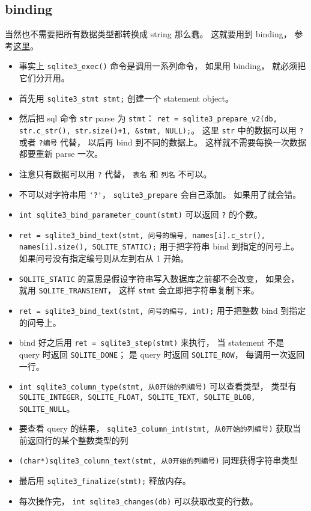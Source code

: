 \subsection{binding}
当然也不需要把所有数据类型都转换成 string 那么蠢。 这就要用到 binding， 参考\href{https://www.sqlite.org/c3ref/bind_blob.html}{这里}。
\begin{itemize}
\item 事实上 \verb`sqlite3_exec()` 命令是调用一系列命令， 如果用 binding， 就必须把它们分开用。
\item 首先用 \verb`sqlite3_stmt stmt;` 创建一个 statement object。
\item 然后把 sql 命令 \verb`str` parse 为 \verb`stmt`： \verb`ret = sqlite3_prepare_v2(db, str.c_str(), str.size()+1, &stmt, NULL);`。 这里 \verb`str` 中的数据可以用 \verb`?` 或者 \verb`?编号` 代替， 以后再 bind 到不同的数据上。 这样就不需要每换一次数据都要重新 parse 一次。
\item 注意只有数据可以用 \verb`?` 代替， \verb`表名` 和 \verb`列名` 不可以。
\item 不可以对字符串用 \verb`'?'`， \verb`sqlite3_prepare` 会自己添加。 如果用了就会错。
\item \verb`int sqlite3_bind_parameter_count(stmt)` 可以返回 \verb`?` 的个数。
\item \verb`ret = sqlite3_bind_text(stmt, 问号的编号, names[i].c_str(), names[i].size(), SQLITE_STATIC);` 用于把字符串 bind 到指定的问号上。 如果问号没有指定编号则从左到右从 1 开始。
\item \verb`SQLITE_STATIC` 的意思是假设字符串写入数据库之前都不会改变， 如果会， 就用 \verb`SQLITE_TRANSIENT`， 这样 \verb`stmt` 会立即把字符串复制下来。
\item \verb`ret = sqlite3_bind_text(stmt, 问号的编号, int);` 用于把整数 bind 到指定的问号上。
\item bind 好之后用 \verb`ret = sqlite3_step(stmt)` 来执行， 当 statement 不是 query 时返回 \verb`SQLITE_DONE`； 是 query 时返回 \verb`SQLITE_ROW`， 每调用一次返回一行。
\item \verb`int sqlite3_column_type(stmt, 从0开始的列编号)` 可以查看类型， 类型有 \verb`SQLITE_INTEGER, SQLITE_FLOAT, SQLITE_TEXT, SQLITE_BLOB, SQLITE_NULL`。
\item 要查看 query 的结果， \verb`sqlite3_column_int(stmt, 从0开始的列编号)` 获取当前返回行的某个整数类型的列
\item \verb`(char*)sqlite3_column_text(stmt, 从0开始的列编号)` 同理获得字符串类型
\item 最后用 \verb`sqlite3_finalize(stmt);` 释放内存。
\item 每次操作完， \verb`int sqlite3_changes(db)` 可以获取改变的行数。
\end{itemize}


